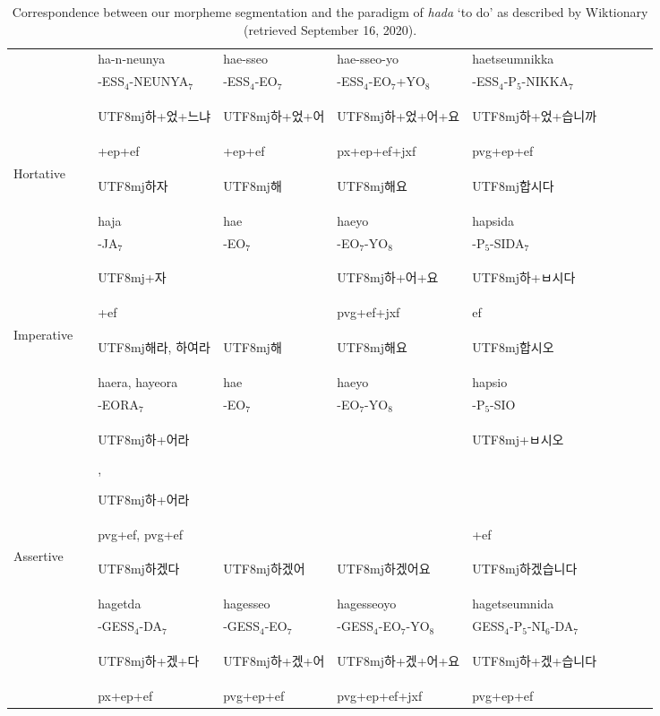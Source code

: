\documentclass[11pt,letterpaper]{article}
\newcommand{\korean}[1]{\begin{CJK}{UTF8}{mj}#1\end{CJK}}
\begin{document}
\begin{table}
\begin{tabular}{llllllllll}
              &  & ha-n-neunya &  hae-sseo &  hae-sseo-yo &  haetseumnikka\\
              &  & -ESS$_4$-NEUNYA$_7$ &  -ESS$_4$-EO$_7$ &  -ESS$_4$-EO$_7$+YO$_8$ &  -ESS$_4$-P$_5$-NIKKA$_7$\\
              &  &  \korean{하+었+느냐}  & \korean{하+었+어} & \korean{하+었+어+요} & \korean{하+었+습니까} \\
              &  & +ep+ef  & +ep+ef            & px+ep+ef+jxf & pvg+ep+ef \\
              \hline
Hortative   && \korean{하자}  & \korean{해}  & \korean{해요}  & \korean{합시다}  \\
   && haja &  hae &  haeyo & hapsida \\
   && -JA$_7$ &  -EO$_7$ &  -EO$_7$-YO$_8$ & -P$_5$-SIDA$_7$ \\
   && \korean{+자} && \korean{하+어+요} & \korean{하+ㅂ시다}\\
   && +ef  && pvg+ef+jxf & ef \\
   \hline
Imperative  && \korean{해라, 하여라}  & \korean{해}  & \korean{해요}  & \korean{합시오}  \\
  && haera, hayeora &  hae &  haeyo &  hapsio \\
  && -EORA$_7$ & -EO$_7$ & -EO$_7$-YO$_8$ & -P$_5$-SIO \\
  && \korean{하+어라}, \korean{하+어라}  &  &    & \korean{+ㅂ시오} \\
  && pvg+ef,  pvg+ef                     &  &    &  +ef\\
  \hline
Assertive   && \korean{하겠다}  & \korean{하겠어}  & \korean{하겠어요}  & \korean{하겠습니다}  \\
   &&  hagetda & hagesseo &  hagesseoyo & hagetseumnida \\
   &&  -GESS$_4$-DA$_7$ & -GESS$_4$-EO$_7$ &  -GESS$_4$-EO$_7$-YO$_8$ & GESS$_4$-P$_5$-NI$_6$-DA$_7$ \\
&& \korean{하+겠+다}  & \korean{하+겠+어}   & \korean{하+겠+어+요} & \korean{하+겠+습니다}\\
&&  px+ep+ef          & pvg+ep+ef   & pvg+ep+ef+jxf & pvg+ep+ef\\
\hline
\end{tabular}
	\caption{Correspondence between our morpheme segmentation and the paradigm of \textit{hada} `to do' as described by Wiktionary (retrieved September 16, 2020).}\label{tab:korean-hada}
\end{table}
\end{document}
